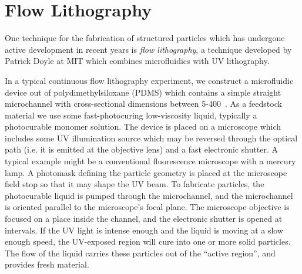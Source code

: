 \section{Flow Lithography}

One technique for the fabrication of structured particles which has undergone active development in recent years is 
\textit{flow lithography}, a technique developed by Patrick Doyle at MIT which combines microfluidics with 
UV lithography.



In a typical continuous flow lithography experiment, we construct a microfluidic device out of polydimethylsiloxane (PDMS)
which contains a simple straight microchannel with cross-sectional dimensions between 5-400~\microns. As a feedstock
material we use some fast-photocuring low-viscosity liquid, typically a photocurable monomer solution. The device is 
placed on a microscope which includes some UV illumination source which may be reversed through the optical path (i.e.
it is emitted at the objective lens) and a fast electronic shutter. A typical example might be a conventional 
fluorescence microscope with a mercury lamp.  A photomask defining the particle geometry is placed at the microscope
field stop so that it may shape the UV beam.
To fabricate particles, the photocurable liquid is pumped through the microchannel, and the microchannel is oriented
parallel to the microscope's focal plane. The microscope objective is focused on a place inside the channel, and the
electronic shutter is opened at intervals. If the UV light is intense enough and the liquid is moving at a slow enough speed,
the UV-exposed region will cure into one or more solid particles.  
The flow of the liquid carries these particles out of the ``active 
region'', and provides fresh material.

